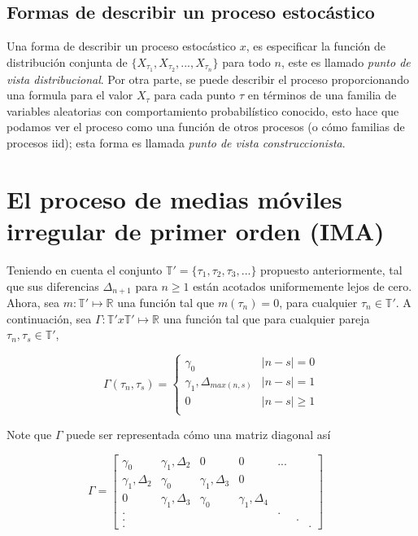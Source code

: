 \subsection{Formas de describir un proceso estocástico}
Una forma de describir un proceso estocástico $x$, es especificar la función de distribución conjunta de 
$\lbrace X_{\tau_1},X_{\tau_2}, ..., X_{\tau_n}\rbrace$ para todo $n$, este es llamado 
\emph{punto de vista distribucional}. Por otra parte, se puede describir el proceso proporcionando 
una formula para el valor $X_{\tau}$ para cada punto $\tau$ en términos de una familia de variables aleatorias 
con comportamiento probabilístico conocido, esto hace que podamos ver el proceso como una función de otros 
procesos (o cómo familias de procesos iid); esta forma es llamada \emph{punto de vista construccionista}.

\section{El proceso de medias móviles irregular de primer orden (IMA)}
\label{sec:IMA}
Teniendo en cuenta el conjunto $\mathbb{T}'= \lbrace \tau_1,\tau_2, \tau_3,... \rbrace$ propuesto anteriormente, 
tal que sus diferencias $\Delta_{n+1}$ para $n\geq 1$ están acotados uniformemente lejos de cero. Ahora, 
sea $m: \mathbb{T}' \mapsto \mathbb{R} $ una función tal que $m(\tau_n)=0$, para cualquier $\tau_n \in \mathbb{T}'$. 
A continuación, sea $\Gamma: \mathbb{T}'x\mathbb{T}' \mapsto \mathbb{R}$ una función tal que para cualquier 
pareja $\tau_n,\tau_s \in \mathbb{T}'$,

\begin{equation*}
\Gamma (\tau_n,\tau_s)=
    \begin{cases}
    \gamma_0& |n-s|=0\\
    \gamma_1,\Delta_{max(n,s)} & |n-s|=1\\
    0 & |n-s|\geq1\\
    \end{cases}
\end{equation*}

Note que $\Gamma$ puede ser representada cómo una matriz diagonal así

\begin{equation}
    \Gamma=
	\begin{bmatrix} 
	\gamma_0 & \gamma_1,\Delta_2 & 0 & 0 & ... \\
	\gamma_1,\Delta_2 & \gamma_0 & \gamma_1,\Delta_3 & 0\\
	0 & \gamma_1,\Delta_3 & \gamma_0 & \gamma_1,\Delta_4 \\
	.& & & & . \\
	.& & & & & .\\
	. & & & & & & .
	\end{bmatrix}
	\quad
	\label{mat1}
\end{equation}

